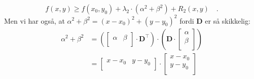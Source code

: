 \begin{bevis}
\begin{equation}
 f(x,y) \geq f(x_{0}, y_{0}) + \lambda_{2}\cdot \left( \alpha^{2} + \beta^{2} \right) + R_{2}(x,y) \quad .
\end{equation}
Men vi har også, at $\alpha^{2} + \beta^{2} = (x-x_{0})^{2} + (y-y_{0})^{2}$ fordi $\mathbf{D}$ er så skikkelig:
\begin{equation}
\begin{aligned}
\alpha^{2} + \beta^{2} &=  \left(\left[
                                          \begin{array}{cc}
                                            \alpha & \beta \\
                                          \end{array}
                                        \right]\cdot \mathbf{D}^{\top}\right)  \cdot \left(\mathbf{D} \cdot \left[
                                                                                   \begin{array}{c}
                                                                                         \alpha  \\
                                                                                         \beta  \\
                                                                                   \end{array}                                                                                \right]\right) \\
&= \left[
                                          \begin{array}{cc}
                                            x-x_{0} & y-y_{0} \\
                                          \end{array}
                                        \right]\cdot \left[
                                                                                   \begin{array}{c}
                                                                                         x- x_{0}  \\
                                                                                         y-y_{0}  \\
                                                                                   \end{array}                                                                                \right] \\

\end{aligned}
\end{equation}
\end{bevis}
